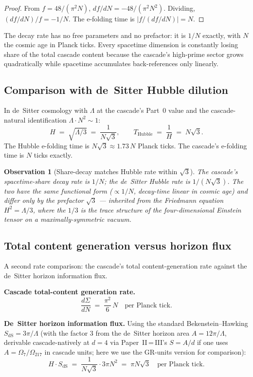 \documentclass[11pt,a4paper]{article}
\newtheorem{observation}[theorem]{Observation}
\begin{document}
\begin{proof}
From $f = 48/(\pi^2 N)$, $df/dN = -48/(\pi^2 N^2)$. Dividing,
$(df/dN)/f = -1/N$. The e-folding time is
$|f/(df/dN)| = N$.
\end{proof}

\noindent The decay rate has no free parameters and no prefactor:
it is $1/N$ exactly, with $N$ the cosmic age in Planck ticks. Every
spacetime dimension is constantly losing share of the total
cascade content because the cascade's high-prime sector grows
quadratically while spacetime accumulates back-references only
linearly.

\subsection*{Comparison with de~Sitter Hubble dilution}

In de~Sitter cosmology with $\Lambda$ at the cascade's Part~0 value
and the cascade-natural identification $\Lambda \cdot N^2 \sim 1$:
\[
H \;=\; \sqrt{\Lambda/3} \;=\; \frac{1}{N\sqrt{3}}, \qquad
T_{\mathrm{Hubble}} \;=\; \frac{1}{H} \;=\; N\sqrt{3}.
\]
The Hubble e-folding time is $N\sqrt{3} \approx 1.73\, N$ Planck
ticks. The cascade's e-folding time is $N$ ticks exactly.

\begin{observation}[Share-decay matches Hubble rate within $\sqrt{3}$]
\label{obs:share-hubble}
The cascade's spacetime-share decay rate is $1/N$; the de~Sitter
Hubble rate is $1/(N\sqrt{3})$. The two have the same functional
form ($\propto 1/N$, decay-time linear in cosmic age) and differ
only by the prefactor $\sqrt{3}$ --- inherited from the Friedmann
equation $H^2 = \Lambda/3$, where the $1/3$ is the trace structure
of the four-dimensional Einstein tensor on a maximally-symmetric
vacuum.
\end{observation}

\subsection*{Total content generation versus horizon flux}

A second rate comparison: the cascade's total content-generation
rate against the de~Sitter horizon information flux.

\textbf{Cascade total-content generation rate.}
\[
\frac{d\Sigma}{dN} \;=\; \frac{\pi^2}{6}\, N \quad\text{per Planck tick.}
\]

\textbf{De~Sitter horizon information flux.} Using the standard
Bekenstein--Hawking $S_{\mathrm{dS}} = 3\pi/\Lambda$ (with the
factor $3$ from the de~Sitter horizon area
$A = 12\pi/\Lambda$, derivable cascade-natively at $d = 4$ via
Paper~II\,=\,III's $S = A/d$ if one uses $A = \Omega_7/\Omega_{217}$
in cascade units; here we use the GR-units version for comparison):
\[
H \cdot S_{\mathrm{dS}} \;=\; \frac{1}{N\sqrt{3}} \cdot 3\pi N^2
\;=\; \pi N \sqrt{3} \quad\text{per Planck tick.}
\]
\end{document}
